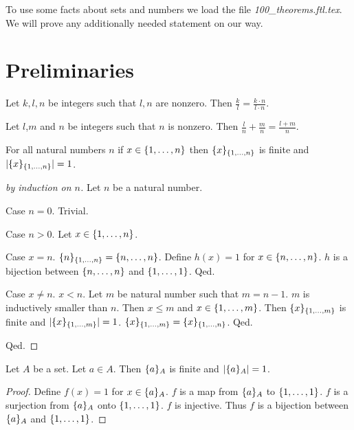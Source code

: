 \documentclass{article}
\begin{document}
To use some facts about sets and numbers we load the file \textit{100\_theorems.ftl.tex}. We will prove any additionally needed statement on our way.
\begin{forthel}
\end{forthel}

\section{Preliminaries}

\begin{forthel}
	
\begin{lemma}
	Let $k,l,n$ be integers such that $l,n$ are nonzero.
	Then $\frac{k}{l} = \frac{k\cdot n}{l \cdot n}$. 
\end{lemma}

\begin{lemma}
	Let $l$,$m$ and $n$ be integers such that $n$ is nonzero.
	Then $\frac{l}{n} + \frac{m}{n} = \frac{l + m}{n}$.
\end{lemma}

\begin{lemma}
	For all natural numbers $n$
	if $x \in \{1,\dots,n\}$
	then $\{x\}_{\{1,\dots,n\}}$ is finite and $|\{x\}_{\{1,\dots,n\}}| = 1$. 
\end{lemma}
\begin{proof}[by induction on $n$]
	Let $n$ be a natural number.
	
	Case $n=0$. Trivial.
	
	Case $n > 0$. 
	Let $x \in \{1,\dots,n\}$. 
	
	Case $x = n$. 
	$\{n\}_{\{1,\dots,n\}} = \{n,\dots,n\}$.
	Define $h(x) = 1$ for $x \in \{n,\dots,n\}$. 
	$h$ is a bijection between $\{n,\dots,n\}$ and $\{1,\dots,1\}$. 
	Qed.
	
	Case $x \neq n$.
	$x < n$.
	Let $m$ be natural number such that $m = n-1$.
	$m$ is inductively smaller than $n$.
	Then $x \leq m$ and $x \in \{1,\dots,m\}$.
	Then $\{x\}_{\{1,\dots,m\}}$ is finite and $|\{x\}_{\{1,\dots,m\}}|=1$.
	$\{x\}_{\{1,\dots,m\}}=\{x\}_{\{1,\dots,n\}}$.
	Qed.
	
	Qed.
\end{proof}

\begin{lemma}
	Let $A$ be a set. Let $a\in A$. Then $\{a\}_{A}$ is finite and $| \{a\}_{A} | = 1$.
\end{lemma}
\begin{proof}
	Define $f(x) = 1$ for $x \in \{a\}_{A}$.
	$f$ is a map from $\{a\}_{A}$ to $\{1,\dots,1\}$.
	$f$ is a surjection from $\{a\}_{A}$ onto $\{1,\dots,1\}$.
	$f$ is injective.
	Thus $f$ is a bijection between $\{a\}_{A}$ and $\{1,\dots,1\}$.
\end{proof}

\end{forthel}
\end{document}
